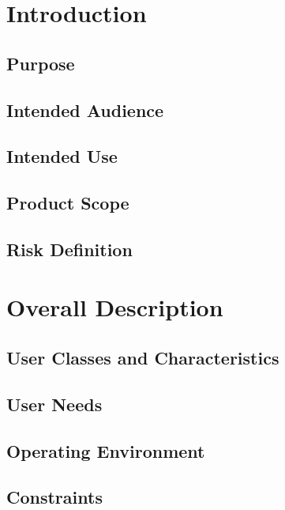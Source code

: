 
\chapter{Introduction}
\label{ch:intro}

\section{Purpose }
\section{Intended Audience}
\section{Intended Use}
\section{Product Scope}

\section{Risk Definition} 



\chapter{Overall Description}
\label{Overall Description}

\section{User Classes and Characteristics}

\section{User Needs}

\section{Operating Environment}

\section{Constraints}

